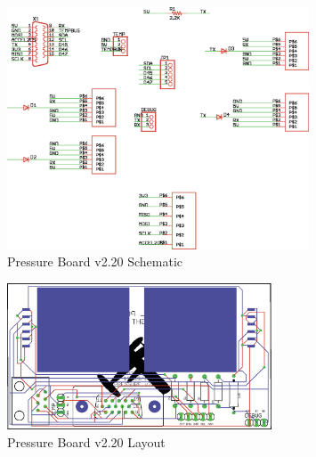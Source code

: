 \begin{figure}[h!]
  \caption{Pressure Board v2.20 Schematic} \label{fig:satelliteSchematic}
  \centering
    \includegraphics[width=0.8\textwidth]{figures/satellitev2Sch.eps}
\end{figure}

\begin{figure}[h!]
  \caption{Pressure Board v2.20 Layout} \label{fig:satelliteBrd}
  \centering
    \includegraphics[width=0.7\textwidth]{figures/satellitev2Brd.eps}
\end{figure}
